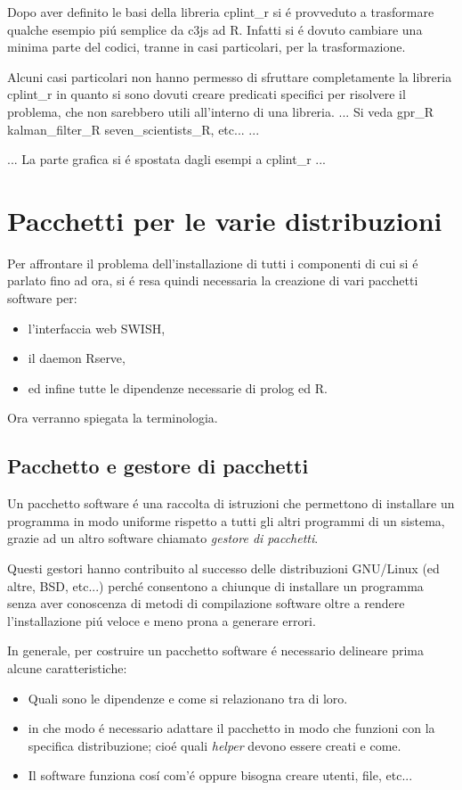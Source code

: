 \documentclass[10pt,titlepage,twoside,a4paper]{report}
\begin{document}
Dopo aver definito le basi della libreria cplint\_r si \'e provveduto a 
trasformare qualche esempio pi\'u semplice da c3js ad R. Infatti si \'e 
dovuto cambiare una minima parte del codici, tranne in casi particolari, per la 
trasformazione.

Alcuni casi particolari non hanno permesso di sfruttare completamente la 
libreria cplint\_r in quanto si sono dovuti creare predicati specifici per 
risolvere il problema, che non sarebbero utili all'interno di una libreria. 
... Si veda gpr\_R kalman\_filter\_R seven\_scientists\_R, etc... ...


... La parte grafica si \'e spostata dagli esempi a cplint\_r ...



\chapter{Pacchetti per le varie distribuzioni} 
\label{ch:pacchetti-per-le-varie-distribuzioni}
Per affrontare il problema dell'installazione di tutti i componenti di cui si 
\'e parlato fino ad ora, si \'e resa quindi necessaria la creazione di vari 
pacchetti software per:
\begin{itemize}
    \item l'interfaccia web SWISH,
    \item il daemon Rserve,
    \item ed infine tutte le dipendenze necessarie di prolog ed R.
\end{itemize}

Ora verranno spiegata la terminologia.

\section{Pacchetto e gestore di pacchetti} \label{pacchetto-e-gestore-di-pacchetti}
Un pacchetto software \'e una raccolta di istruzioni che permettono di 
installare un programma in modo uniforme rispetto a tutti gli altri programmi 
di un sistema, grazie ad un altro software chiamato \emph{gestore di 
pacchetti}.

Questi gestori hanno contribuito al successo delle distribuzioni GNU/Linux (ed 
altre, BSD, etc...) perch\'e consentono a chiunque di installare un programma 
senza aver conoscenza di metodi di compilazione software oltre a rendere 
l'installazione pi\'u veloce e meno prona a generare errori.

In generale, per costruire un pacchetto software \'e necessario delineare prima 
alcune caratteristiche:
\begin{itemize}
    \item Quali sono le dipendenze e come si relazionano tra di loro.
    \item in che modo \'e necessario adattare il pacchetto in modo che funzioni 
          con la specifica distribuzione; cio\'e quali \emph{helper} devono 
essere creati e come.
    \item Il software funziona cos\'i com'\'e oppure bisogna creare utenti, 
file, etc...
\end{itemize}
\end{document}
